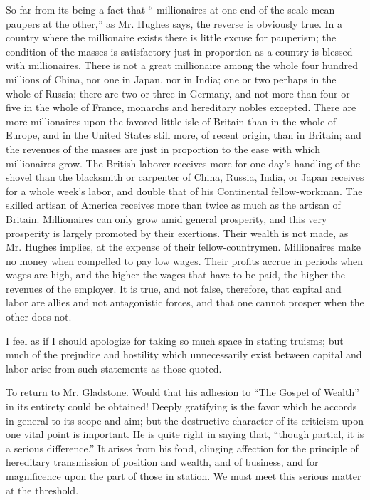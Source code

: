 \documentclass[11pt,openany]{book}
\begin{document}
So far from its being a fact that `` millionaires at one end of the scale mean paupers at the other,'' as Mr. Hughes says, the reverse is obviously true. In a country where the millionaire exists there is little excuse for pauperism; the condition of the masses is satisfactory just in proportion as a country is blessed with millionaires. There is not a great millionaire among the whole four hundred millions of China, nor one in Japan, nor in India; one or two perhaps in the whole of Russia; there are two or three in Germany, and not more than four or five in the whole of France, monarchs and hereditary nobles excepted. There are more millionaires upon the favored little isle of Britain than in the whole of Europe, and in the United States still more, of recent origin, than in Britain; and the revenues of the masses are just in proportion to the ease with which millionaires grow. The British laborer receives more for one day's handling of the shovel than the blacksmith or carpenter of China, Russia, India, or Japan receives for a whole week's labor, and double that of his Continental fellow-workman. The skilled artisan of America receives more than twice as much as the artisan of Britain. Millionaires can only grow amid general prosperity, and this very prosperity is largely promoted by their exertions. Their wealth is not made, as Mr. Hughes implies, at the expense of their fellow-countrymen. Millionaires make no money when compelled to pay low wages. Their profits accrue in periods when wages are high, and the higher the wages that have to be paid, the higher the revenues of the employer. It is true, and not false, therefore, that capital and labor are allies and not antagonistic forces, and that one cannot prosper when the other does not.

I feel as if I should apologize for taking so much space in stating truisms; but much of the prejudice and hostility which unnecessarily exist between capital and labor arise from such statements as those quoted.

To return to Mr. Gladstone. Would that his adhesion to ``The Gospel of Wealth'' in its entirety could be obtained! Deeply gratifying is the favor which he accords in general to its scope and aim; but the destructive character of its criticism upon one vital point is important. He is quite right in saying that, ``though partial, it is a serious difference.'' It arises from his fond, clinging affection for the principle of hereditary transmission of position and wealth, and of business, and for magnificence upon the part of those in station. We must meet this serious matter at the threshold.
\end{document}
